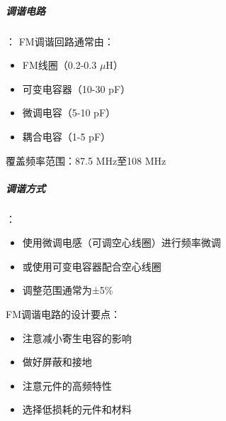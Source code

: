 \subparagraph{调谐电路}：
FM调谐回路通常由：
\begin{itemize}
    \item FM线圈（0.2-0.3 $\mu$H）
    \item 可变电容器（10-30 pF）
    \item 微调电容（5-10 pF）
    \item 耦合电容（1-5 pF）
\end{itemize}
覆盖频率范围：87.5 MHz至108 MHz

\subparagraph{调谐方式}：
\begin{itemize}
    \item 使用微调电感（可调空心线圈）进行频率微调
    \item 或使用可变电容器配合空心线圈
    \item 调整范围通常为±5\%
\end{itemize}

FM调谐电路的设计要点：
\begin{itemize}
    \item 注意减小寄生电容的影响
    \item 做好屏蔽和接地
    \item 注意元件的高频特性
    \item 选择低损耗的元件和材料
\end{itemize}
